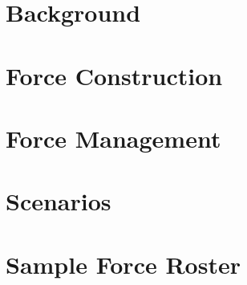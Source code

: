 \documentclass{article}
\begin{document}
\newpage

\section{Background}



\newpage

\section{Force Construction}



\newpage

\section{Force Management}



\newpage

\section{Scenarios}



\newpage

\section{Sample Force Roster}


\end{document}
